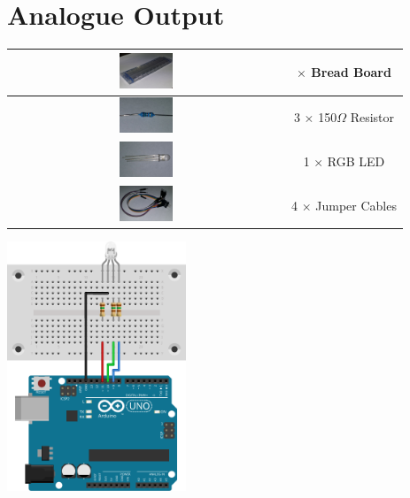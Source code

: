 \section{Analogue Output}
\setlength{\tabcolsep}{0pt}
\begin{center}
\begin{tabular}{|c| c |}
\hline
    \includegraphics[align=c,width=0.2\textwidth]{./Graphics/breadboard}
    & 
    \begin{minipage}[t]{0.2\textwidth}
        \centering
        1 $\times$ Bread Board 
    \end{minipage}\\ \hline
    \includegraphics[align=c,width=0.2\textwidth]{./Graphics/150_resistor} 
    & 3 $\times$ 150$\Omega$ Resistor \\ \hline
    \includegraphics[align=c,width=0.2\textwidth]{./Graphics/rgb_led}
    & 1 $\times$ RGB LED \\ \hline
    \includegraphics[align=c,width=0.2\textwidth]{./Graphics/jumper_cables}
    & 4 $\times$ Jumper Cables \\ \hline
  \end{tabular}
\end{center}

\begin{center}
    \includegraphics[width=0.4\textwidth]{./Graphics/rgb_led_circuit}
\end{center}

